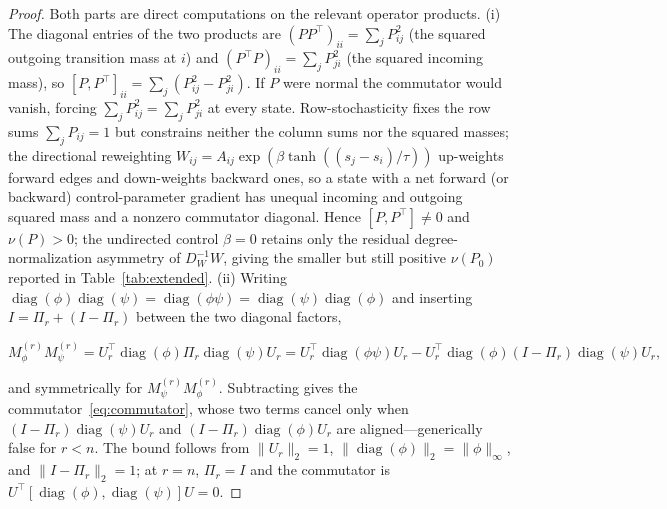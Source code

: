 \documentclass[aps,prresearch,reprint,amsmath,amssymb,nofootinbib,superscriptaddress,floatfix]{revtex4-2}
\theoremstyle{definition}
\theoremstyle{remark}
\theoremstyle{plain}
\begin{document}
\begin{proof}
Both parts are direct computations on the relevant operator products. (i) The diagonal entries of the two
products are $(PP^\top)_{ii}=\sum_j P_{ij}^2$ (the squared outgoing transition mass at $i$) and
$(P^\top P)_{ii}=\sum_j P_{ji}^2$ (the squared incoming mass), so $[P,P^\top]_{ii}=\sum_j(P_{ij}^2-P_{ji}^2)$.
If $P$ were normal the commutator would vanish, forcing $\sum_j P_{ij}^2=\sum_j P_{ji}^2$ at every state.
Row-stochasticity fixes the row sums $\sum_j P_{ij}=1$ but constrains neither the column sums nor the
squared masses; the directional reweighting $W_{ij}=A_{ij}\exp(\beta\tanh((s_j-s_i)/\tau))$ up-weights
forward edges and down-weights backward ones, so a state with a net forward (or backward) control-parameter
gradient has unequal incoming and outgoing squared mass and a nonzero commutator diagonal. Hence
$[P,P^\top]\neq0$ and $\nu(P)>0$; the undirected control $\beta=0$ retains only the residual
degree-normalization asymmetry of $D_W^{-1}W$, giving the smaller but still positive $\nu(P_0)$ reported in
Table~\ref{tab:extended}.
(ii) Writing $\operatorname{diag}(\phi)\operatorname{diag}(\psi)=\operatorname{diag}(\phi\psi)
=\operatorname{diag}(\psi)\operatorname{diag}(\phi)$ and inserting $I=\Pi_r+(I-\Pi_r)$ between the two
diagonal factors,
\begin{widetext}
\begin{equation}
M_\phi^{(r)}M_\psi^{(r)}=U_r^\top\operatorname{diag}(\phi)\Pi_r\operatorname{diag}(\psi)U_r
=U_r^\top\operatorname{diag}(\phi\psi)U_r-U_r^\top\operatorname{diag}(\phi)(I-\Pi_r)\operatorname{diag}(\psi)U_r,
\end{equation}
\end{widetext}
and symmetrically for $M_\psi^{(r)}M_\phi^{(r)}$. Subtracting gives the commutator~\eqref{eq:commutator},
whose two terms cancel only when $(I-\Pi_r)\operatorname{diag}(\psi)U_r$ and
$(I-\Pi_r)\operatorname{diag}(\phi)U_r$ are aligned---generically false for $r<n$. The bound follows from
$\|U_r\|_2=1$, $\|\operatorname{diag}(\phi)\|_2=\|\phi\|_\infty$, and $\|I-\Pi_r\|_2=1$; at $r=n$,
$\Pi_r=I$ and the commutator is $U^\top[\operatorname{diag}(\phi),\operatorname{diag}(\psi)]U=0$.
\end{proof}
\end{document}
